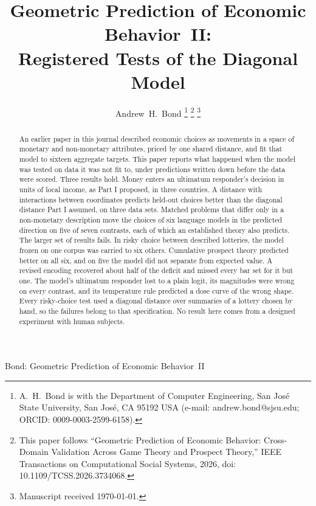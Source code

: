 \documentclass[journal]{IEEEtran}
\begin{document}
\title{Geometric Prediction of Economic Behavior~II:\\Registered Tests of the Diagonal Model}

\author{Andrew~H.~Bond%
\thanks{A.~H.~Bond is with the Department of Computer Engineering, San Jos\'{e} State University, San Jos\'{e}, CA 95192 USA (e-mail: andrew.bond@sjsu.edu; ORCID: 0009-0003-2599-6158).}%
\thanks{This paper follows ``Geometric Prediction of Economic Behavior: Cross-Domain Validation Across Game Theory and Prospect Theory,'' IEEE Transactions on Computational Social Systems, 2026, doi: 10.1109/TCSS.2026.3734068.}%
\thanks{Manuscript received \today.}}

%
{Bond: Geometric Prediction of Economic Behavior~II}

\maketitle

\begin{abstract}
An earlier paper in this journal described economic choices as movements in a space of monetary and non-monetary attributes, priced by one shared distance, and fit that model to sixteen aggregate targets.
This paper reports what happened when the model was tested on data it was not fit to, under predictions written down before the data were scored.
Three results hold.
Money enters an ultimatum responder's decision in units of local income, as Part I proposed, in three countries.
A distance with interactions between coordinates predicts held-out choices better than the diagonal distance Part I assumed, on three data sets.
Matched problems that differ only in a non-monetary description move the choices of six language models in the predicted direction on five of seven contrasts, each of which an established theory also predicts.
The larger set of results fails.
In risky choice between described lotteries, the model frozen on one corpus was carried to six others.
Cumulative prospect theory predicted better on all six, and on five the model did not separate from expected value.
A revised encoding recovered about half of the deficit and missed every bar set for it but one.
The model's ultimatum responder lost to a plain logit, its magnitudes were wrong on every contrast, and its temperature rule predicted a dose curve of the wrong shape.
Every risky-choice test used a diagonal distance over summaries of a lottery chosen by hand, so the failures belong to that specification.
No result here comes from a designed experiment with human subjects.
\end{abstract}
\end{document}
